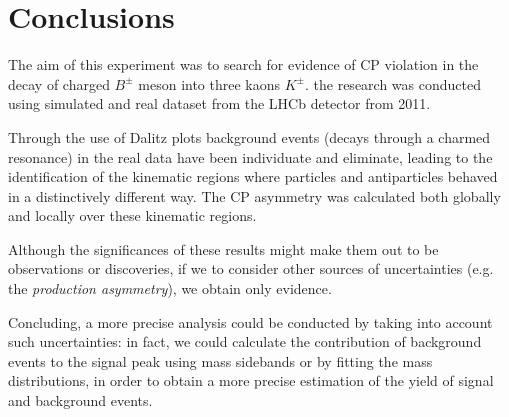 \chapter*{Conclusions}\label{chap:conclusion}

The aim of this experiment was to search for evidence of CP violation in the decay of charged $B^{\pm}$ meson into three kaons $K^{\pm}$.
the research was conducted using simulated and real dataset from the LHCb detector from 2011.

Through the use of Dalitz plots background events (decays through a charmed resonance) in the real data have been individuate and eliminate, leading to the identification of the kinematic regions where particles and antiparticles behaved in a distinctively different way. The CP asymmetry was calculated both globally and locally over these kinematic regions.

Although the significances of these results might make them out to be observations or discoveries, if we to consider other sources of uncertainties (e.g. the \emph{production asymmetry}), we obtain only evidence.

Concluding, a more precise analysis could be conducted by taking into account such uncertainties: in fact, we could calculate the contribution of background events to the signal peak using mass sidebands or by fitting the mass distributions, in order to obtain a more precise estimation of the yield of signal and background events.
